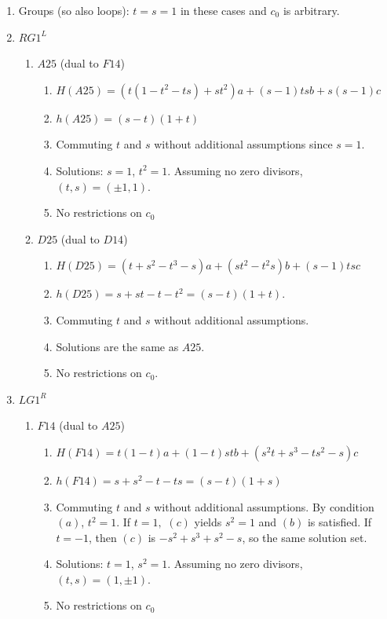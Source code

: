 \documentclass[11pt]{amsart}
\theoremstyle{definition}
\begin{document}
\bigskip

    
\bigskip


    \begin{enumerate}

        \item[(1)] Groups (so also loops): $t=s=1$ in these cases and $c_0$ is arbitrary.
        \item[(2)] $RG1^L$
        \begin{enumerate}
            \item \textbf{$A25$} (dual to $F14$)
            \begin{enumerate}
                \item $H(A25) = (t(1-t^2-ts)+st^2)a+(s-1)tsb+s(s-1)c$
                \item  $h(A25)=(s-t)(1+t)$
                \item Commuting $t$ and $s$ without additional assumptions since $s=1$.
                \item Solutions: $s=1$, $t^2 = 1$.
                Assuming no zero divisors, $(t,s) = (\pm 1, 1)$.
                \item No restrictions on $c_0$
            \end{enumerate}
           
            \item \textbf{$D25$} (dual to $D14$)
            \begin{enumerate}
                \item  $H(D25) = (t+s^2-t^3-s)a + (st^2 -t^2s)b +(s-1)tsc$
                \item  $h(D25) = s+st-t-t^2=(s-t)(1+t)$.
                \item Commuting $t$ and $s$ without additional assumptions.
                \item Solutions are the same as $A25$.
                \item No restrictions on $c_0$.
            \end{enumerate}
        \end{enumerate}

        \item[(3)] $LG1^R$
        \begin{enumerate}
            \item \textbf{$F14$} (dual to $A25$)
            \begin{enumerate}
                \item $H(F14) = t(1-t)a+(1-t)stb+(s^2t+s^3-ts^2-s)c$
                \item  $h(F14) = s+s^2 -t -ts = (s - t)(1 + s)$
                \item Commuting $t$ and $s$ without additional assumptions. By condition $(a)$, $t^2=1$. If $t=1,$ $(c)$ yields $s^2=1$ and $(b)$ is satisfied. If $t=-1$, then $(c)$ is $-s^2 + s^3 + s^2 -s$, so the same solution set.
                \item Solutions: $t=1$, $s^2=1$. Assuming no zero divisors, $(t,s) = (1, \pm 1)$.
                \item No restrictions on $c_0$
            \end{enumerate}
           

\end{enumerate}
\end{enumerate}
\end{document}
